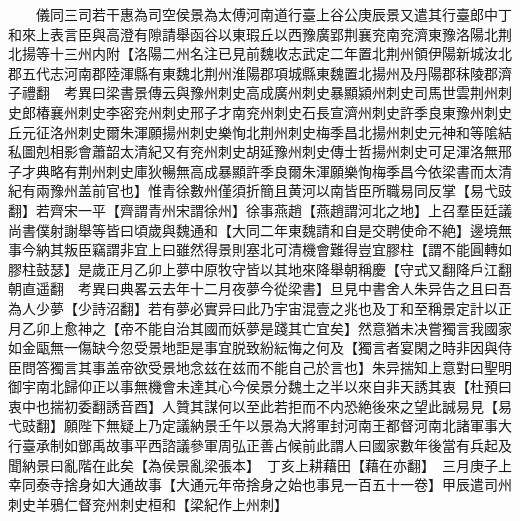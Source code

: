 　　儀同三司若干惠為司空侯景為太傅河南道行臺上谷公庚辰景又遣其行臺郎中丁和來上表言臣與高澄有隙請舉函谷以東瑕丘以西豫廣郢荆襄兖南兖濟東豫洛陽北荆北揚等十三州内附【洛陽二州名注已見前魏收志武定二年置北荆州領伊陽新城汝北郡五代志河南郡陸渾縣有東魏北荆州淮陽郡項城縣東魏置北揚州及丹陽郡秣陵郡濟子禮翻　考異曰梁書景傳云與豫州刺史高成廣州刺史暴顯潁州刺史司馬世雲荆州刺史郎椿襄州刺史李密兖州刺史邢子才南兖州刺史石長宣濟州刺史許季良東豫州刺史丘元征洛州刺史爾朱渾願揚州刺史樂恂北荆州刺史梅季昌北揚州刺史元神和等隂結私圖剋相影會蕭韶太清紀又有兖州刺史胡延豫州刺史傳士哲揚州刺史可足渾洛無邢子才典略有荆州刺史庫狄暢無高成暴顯許季良爾朱渾願樂恂梅季昌今依梁書而太清紀有兩豫州盖前官也】惟青徐數州僅須折簡且黄河以南皆臣所職易同反掌【易弋豉翻】若齊宋一平【齊謂青州宋謂徐州】徐事燕趙【燕趙謂河北之地】上召羣臣廷議尚書僕射謝舉等皆曰頃歲與魏通和【大同二年東魏請和自是交聘使命不絶】邊境無事今納其叛臣竊謂非宜上曰雖然得景則塞北可清機會難得豈宜膠柱【謂不能圓轉如膠柱鼓瑟】是歲正月乙卯上夢中原牧守皆以其地來降舉朝稱慶【守式又翻降戶江翻朝直遥翻　考異曰典畧云去年十二月夜夢今從梁書】旦見中書舍人朱异告之且曰吾為人少夢【少詩沼翻】若有夢必實异曰此乃宇宙混壹之兆也及丁和至稱景定計以正月乙卯上愈神之【帝不能自治其國而妖夢是踐其亡宜矣】然意猶未决嘗獨言我國家如金甌無一傷缺今忽受景地詎是事宜脱致紛紜悔之何及【獨言者宴閑之時非因與侍臣問答獨言其事盖帝欲受景地念兹在兹而不能自己於言也】朱异揣知上意對曰聖明御宇南北歸仰正以事無機會未達其心今侯景分魏土之半以來自非天誘其衷【杜預曰衷中也揣初委翻誘音酉】人贊其謀何以至此若拒而不内恐絶後來之望此誠易見【易弋豉翻】願陛下無疑上乃定議納景壬午以景為大將軍封河南王都督河南北諸軍事大行臺承制如鄧禹故事平西諮議參軍周弘正善占候前此謂人曰國家數年後當有兵起及聞納景曰亂階在此矣【為侯景亂梁張本】　丁亥上耕藉田【藉在亦翻】　三月庚子上幸同泰寺捨身如大通故事【大通元年帝捨身之始也事見一百五十一卷】甲辰遣司州刺史羊鴉仁督兖州刺史桓和【梁紀作上州刺】


